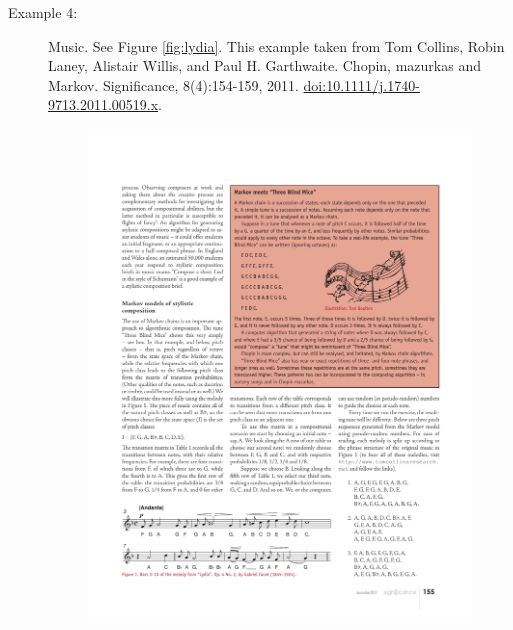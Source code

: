 \documentclass[11pt]{article}
\begin{document}
\begin{description}

\item[Example 4:] Music.  See Figure \ref{fig:lydia}. This example taken from  Tom Collins, Robin Laney, Alistair Willis, and Paul H. Garthwaite. Chopin, mazurkas and Markov. Significance, 8(4):154-159, 2011. \href{http://onlinelibrary.wiley.com/doi/10.1111/j.1740-9713.2011.00519.x/pdf}{doi:10.1111/j.1740-9713.2011.00519.x}.

\begin{figure}[hbtp]
\includegraphics[width=14cm]{figures/lydia}

\end{figure}
\end{description}
\end{document}
